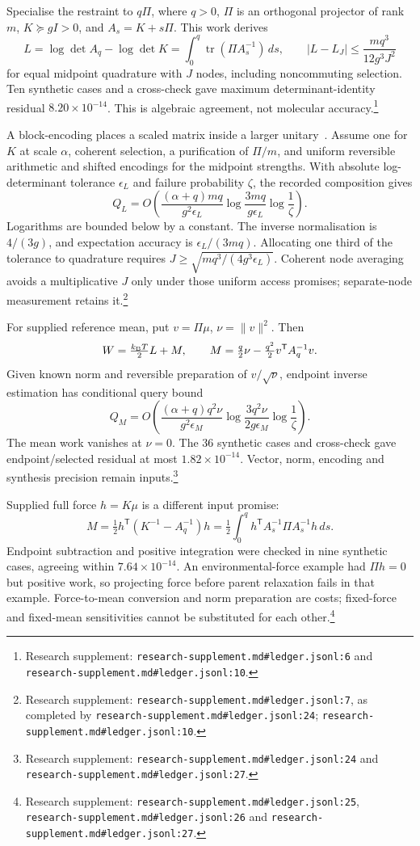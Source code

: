 \documentclass{article}
\begin{document}
Specialise the restraint to \(q\Pi\), where \(q>0\), \(\Pi\) is an orthogonal projector of rank \(m\), \(K\succeq gI>0\), and \(A_s=K+s\Pi\). This work derives
\[
 L=\log\det A_q-\log\det K
  =\int_0^q\operatorname{tr}(\Pi A_s^{-1})\,ds,
 \qquad
 |L-L_J|\leq\frac{mq^3}{12g^3J^2}
\]
for equal midpoint quadrature with \(J\) nodes, including noncommuting selection. Ten synthetic cases and a cross-check gave maximum determinant-identity residual \(8.20\times10^{-14}\). This is algebraic agreement, not molecular accuracy.\footnote{Research supplement: \nolinkurl{research-supplement.md\#ledger.jsonl:6} and \nolinkurl{research-supplement.md\#ledger.jsonl:10}.}

A block-encoding places a scaled matrix inside a larger unitary~\cite{P}. Assume one for \(K\) at scale \(\alpha\), coherent selection, a purification of \(\Pi/m\), and uniform reversible arithmetic and shifted encodings for the midpoint strengths. With absolute log-determinant tolerance \(\epsilon_L\) and failure probability \(\zeta\), the recorded composition gives
\[
 Q_L=O\!\left(
 \frac{(\alpha+q)mq}{g^2\epsilon_L}
 \log\frac{3mq}{g\epsilon_L}\log\frac1\zeta\right).
\]
Logarithms are bounded below by a constant. The inverse normalisation is \(4/(3g)\), and expectation accuracy is \(\epsilon_L/(3mq)\). Allocating one third of the tolerance to quadrature requires \(J\geq\sqrt{mq^3/(4g^3\epsilon_L)}\). Coherent node averaging avoids a multiplicative \(J\) only under those uniform access promises; separate-node measurement retains it.\footnote{Research supplement: \nolinkurl{research-supplement.md\#ledger.jsonl:7}, as completed by \nolinkurl{research-supplement.md\#ledger.jsonl:24}; \nolinkurl{research-supplement.md\#ledger.jsonl:10}.}

For supplied reference mean, put \(v=\Pi\mu\), \(\nu=\|v\|^2\). Then
\[
 W=\tfrac{k_{\rm B}T}{2}L+M,\qquad
 M=\tfrac q2\nu-\tfrac{q^2}{2}v^{\mathsf T}A_q^{-1}v.
\]
Given known norm and reversible preparation of \(v/\sqrt\nu\), endpoint inverse estimation has conditional query bound
\[
 Q_M=O\!\left(
 \frac{(\alpha+q)q^2\nu}{g^2\epsilon_M}
 \log\frac{3q^2\nu}{2g\epsilon_M}\log\frac1\zeta\right).
\]
The mean work vanishes at \(\nu=0\). The 36 synthetic cases and cross-check gave endpoint/selected residual at most \(1.82\times10^{-14}\). Vector, norm, encoding and synthesis precision remain inputs.\footnote{Research supplement: \nolinkurl{research-supplement.md\#ledger.jsonl:24} and \nolinkurl{research-supplement.md\#ledger.jsonl:27}.}

Supplied full force \(h=K\mu\) is a different input promise:
\[
 M=\tfrac12h^{\mathsf T}(K^{-1}-A_q^{-1})h
  =\tfrac12\int_0^q h^{\mathsf T}A_s^{-1}\Pi A_s^{-1}h\,ds.
\]
Endpoint subtraction and positive integration were checked in nine synthetic cases, agreeing within \(7.64\times10^{-14}\). An environmental-force example had \(\Pi h=0\) but positive work, so projecting force before parent relaxation fails in that example. Force-to-mean conversion and norm preparation are costs; fixed-force and fixed-mean sensitivities cannot be substituted for each other.\footnote{Research supplement: \nolinkurl{research-supplement.md\#ledger.jsonl:25}, \nolinkurl{research-supplement.md\#ledger.jsonl:26} and \nolinkurl{research-supplement.md\#ledger.jsonl:27}.}
\end{document}
